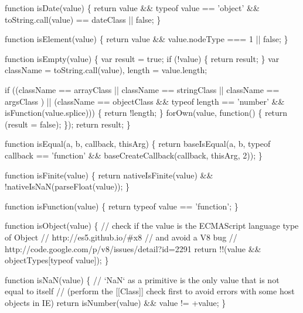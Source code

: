 \begin{DoxyCodeInclude}
    \textcolor{keyword}{function} isDate(value) \{
      \textcolor{keywordflow}{return} value && typeof value == \textcolor{stringliteral}{'object'} && toString.call(value) == dateClass || \textcolor{keyword}{false};
    \}

    \textcolor{keyword}{function} isElement(value) \{
      \textcolor{keywordflow}{return} value && value.nodeType === 1 || \textcolor{keyword}{false};
    \}

    \textcolor{keyword}{function} isEmpty(value) \{
      var result = \textcolor{keyword}{true};
      \textcolor{keywordflow}{if} (!value) \{
        \textcolor{keywordflow}{return} result;
      \}
      var className = toString.call(value),
          length = value.length;

      \textcolor{keywordflow}{if} ((className == arrayClass || className == stringClass || className == argsClass ) ||
          (className == objectClass && typeof length == \textcolor{stringliteral}{'number'} && isFunction(value.splice))) \{
        \textcolor{keywordflow}{return} !length;
      \}
      forOwn(value, \textcolor{keyword}{function}() \{
        \textcolor{keywordflow}{return} (result = \textcolor{keyword}{false});
      \});
      \textcolor{keywordflow}{return} result;
    \}

    \textcolor{keyword}{function} isEqual(a, b, callback, thisArg) \{
      \textcolor{keywordflow}{return} baseIsEqual(a, b, typeof callback == \textcolor{stringliteral}{'function'} && baseCreateCallback(callback, thisArg, 2));
    \}

    \textcolor{keyword}{function} isFinite(value) \{
      \textcolor{keywordflow}{return} nativeIsFinite(value) && !nativeIsNaN(parseFloat(value));
    \}

    \textcolor{keyword}{function} isFunction(value) \{
      \textcolor{keywordflow}{return} typeof value == \textcolor{stringliteral}{'function'};
    \}

    \textcolor{keyword}{function} isObject(value) \{
      \textcolor{comment}{// check if the value is the ECMAScript language type of Object}
      \textcolor{comment}{// http://es5.github.io/#x8}
      \textcolor{comment}{// and avoid a V8 bug}
      \textcolor{comment}{// http://code.google.com/p/v8/issues/detail?id=2291}
      \textcolor{keywordflow}{return} !!(value && objectTypes[typeof value]);
    \}

    \textcolor{keyword}{function} isNaN(value) \{
      \textcolor{comment}{// `NaN` as a primitive is the only value that is not equal to itself}
      \textcolor{comment}{// (perform the [[Class]] check first to avoid errors with some host objects in IE)}
      \textcolor{keywordflow}{return} isNumber(value) && value != +value;
    \}


\end{DoxyCodeInclude}
